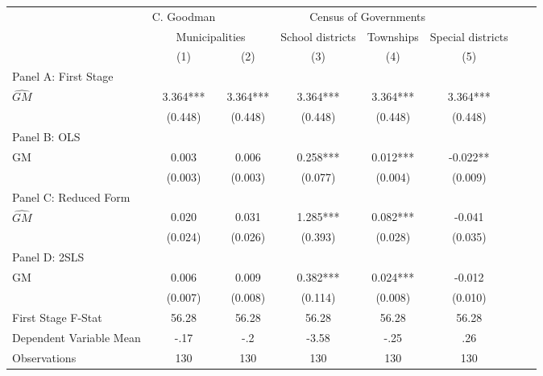  \begin{tabular}{l*{7}{c}} \toprule
&\multicolumn{1}{c}{C. Goodman}&\multicolumn{4}{c}{Census of Governments}\\\cmidrule(lr){2-2}\cmidrule(lr){3-6}
&\multicolumn{2}{c}{Municipalities}&\multicolumn{1}{c}{School districts}&\multicolumn{1}{c}{Townships}&\multicolumn{1}{c}{Special districts}\\\cmidrule(lr){2-3}\cmidrule(lr){4-6}
&\multicolumn{1}{c}{(1)}&\multicolumn{1}{c}{(2)}&\multicolumn{1}{c}{(3)}&\multicolumn{1}{c}{(4)}&\multicolumn{1}{c}{(5)}\\
\cmidrule(lr){1-6}
\multicolumn{5}{l}{Panel A: First Stage}\\
\cmidrule(lr){1-6}
$\widehat{GM}$  &    3.364***&    3.364***&    3.364***&    3.364***&    3.364***\\
                &  (0.448)   &  (0.448)   &  (0.448)   &  (0.448)   &  (0.448)   \\
\cmidrule(lr){1-6}
\multicolumn{5}{l}{Panel B: OLS}\\
\cmidrule(lr){1-6}
GM              &    0.003   &    0.006   &    0.258***&    0.012***&   -0.022** \\
                &  (0.003)   &  (0.003)   &  (0.077)   &  (0.004)   &  (0.009)   \\
\cmidrule(lr){1-6}
\multicolumn{5}{l}{Panel C: Reduced Form}\\
\cmidrule(lr){1-6}
$\widehat{GM}$  &    0.020   &    0.031   &    1.285***&    0.082***&   -0.041   \\
                &  (0.024)   &  (0.026)   &  (0.393)   &  (0.028)   &  (0.035)   \\
\cmidrule(lr){1-6}
\multicolumn{5}{l}{Panel D: 2SLS}\\
\cmidrule(lr){1-6}
GM              &    0.006   &    0.009   &    0.382***&    0.024***&   -0.012   \\
                &  (0.007)   &  (0.008)   &  (0.114)   &  (0.008)   &  (0.010)   \\
\midrule
First Stage F-Stat&    56.28   &    56.28   &    56.28   &    56.28   &    56.28   \\
Dependent Variable Mean&     -.17   &      -.2   &    -3.58   &     -.25   &      .26   \\
Observations    &      130   &      130   &      130   &      130   &      130   \\
 \bottomrule \end{tabular}

